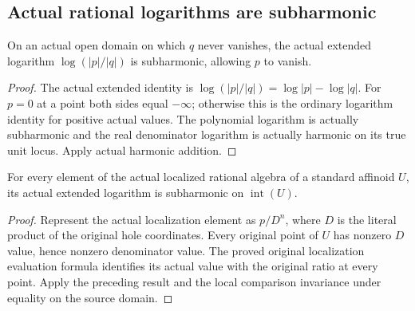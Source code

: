 \subsection{Actual rational logarithms are subharmonic}\label{subsec:fc-line-rational-log-subharmonic}

\begin{lemma}\label{lem:fc-rational-ratio-log-subharmonic}
\leanok
{}
On an actual open domain on which $q$ never vanishes, the actual extended
logarithm $\log(|p|/|q|)$ is subharmonic, allowing $p$ to vanish.
\end{lemma}

\begin{proof}
The actual extended identity is $\log(|p|/|q|)=\log|p|-\log|q|$.
For $p=0$ at a point both sides equal $-\infty$; otherwise this is the
ordinary logarithm identity for positive actual values. The polynomial
logarithm is actually subharmonic and the real denominator logarithm is
actually harmonic on its true unit locus. Apply actual harmonic addition.
\end{proof}

\begin{theorem}\label{thm:fc-localized-rational-log-subharmonic}
\leanok
{}
For every element of the actual localized rational algebra of a standard
affinoid $U$, its actual extended logarithm is subharmonic on
$\operatorname{int}(U)$.
\end{theorem}

\begin{proof}
Represent the actual localization element as $p/D^n$, where $D$ is the
literal product of the original hole coordinates. Every original point
of $U$ has nonzero $D$ value, hence nonzero denominator value. The proved
original localization evaluation formula identifies its actual value with
the original ratio at every point. Apply the preceding result and the
local comparison invariance under equality on the source domain.
\end{proof}
